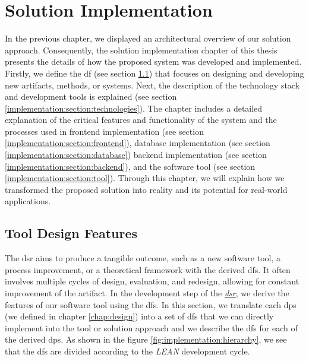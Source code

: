 
\chapter{Solution Implementation}
\label{chap:implementation}
\ifpdf
    \graphicspath{{Chapters/Implementation/Figs/}{Chapters/Implementation/Figs/}{Chapters/Implementation/Figs/}}
\else
    \graphicspath{{Chapters/Implementation/Figs/}{Chapters/Implementation/Figs/}}
\fi
In the previous chapter, we displayed an architectural overview of our solution approach.
Consequently, the solution implementation chapter of this thesis presents the details of how the proposed system was developed and implemented.
Firstly, we define the \ac{df} (see section \ref{implementation:section:designfeatures}) that focuses on designing and developing new artifacts, methods, or systems.
Next, the description of the technology stack and development tools is explained (see section \ref{implementation:section:technologies}).
The chapter includes a detailed explanation of the critical features and functionality of the system and the processes used in frontend implementation (see section \ref{implementation:section:frontend}), database implementation (see section \ref{implementation:section:database}) backend implementation (see section \ref{implementation:section:backend}), and the software tool (see section \ref{implementation:section:tool}).
Through this chapter, we will explain how we transformed the proposed solution into reality and its potential for real-world applications.

\section{Tool Design Features}
\label{implementation:section:designfeatures}
The \ac{dsr} aims to produce a tangible outcome, such as a new software tool, a process improvement, or a theoretical framework with the derived \ac{df}s.
It often involves multiple cycles of design, evaluation, and redesign, allowing for constant improvement of the artifact.
In the development step of the \hyperref[introduction:section:research]{\textit{\ac{dsr}}}, we derive the features of our software tool using the \ac{df}s.
In this section, we translate each \ac{dp}s (we defined in chapter \ref{chap:design}) into a set of \ac{df}s that we can directly implement into the tool or solution approach and we describe the \ac{df}s for each of the derived \ac{dp}s.
As shown in the figure \ref{fig:implementation:hierarchy}, we see that the \ac{df}s are divided according to the \textit{LEAN} development cycle.
\clearpage

